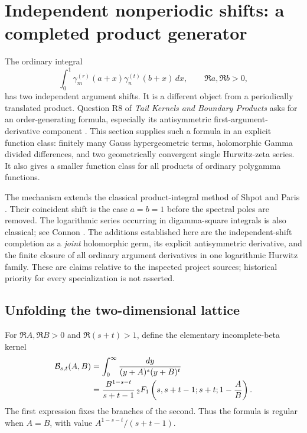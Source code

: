 \newcommand{\gsZ}{\mathcal Z}
\newcommand{\gsJ}{\mathcal J}
\newcommand{\gsB}{\mathcal B}
\newcommand{\gsV}{\mathcal V}
\newcommand{\gsQ}{\mathcal Q}
\newcommand{\gsE}{\mathcal E}
\newcommand{\gsT}{\mathcal T}
\newcommand{\gsL}{\mathcal L}

\section{Independent nonperiodic shifts: a completed product generator}
\label{gs:section}

The ordinary integral
\[
 \int_0^1\gamma_m^{(r)}(a+x)\gamma_n^{(t)}(b+x)\,dx,
 \qquad \Re a,\Re b>0,
\]
has two independent argument shifts.  It is a different object from a
periodically translated product.  Question R8 of \emph{Tail Kernels and
Boundary Products} asks for an order-generating formula, especially its
antisymmetric first-argument-derivative component
\cite{RepoTailKernels}.  This section supplies such a formula in an
explicit function class: finitely many Gauss hypergeometric terms,
holomorphic Gamma divided differences, and two geometrically convergent
single Hurwitz-zeta series.  It also gives a smaller function class for
all products of ordinary polygamma functions.

The mechanism extends the classical product-integral method of
Shpot and Paris \cite{ShpotParis}.  Their coincident shift is the
case $a=b=1$ before the spectral poles are removed.  The logarithmic
series occurring in digamma-square integrals is also classical; see
Connon \cite{Connon}.  The additions established here are the
independent-shift completion as a \emph{joint} holomorphic germ, its
explicit antisymmetric derivative, and the finite closure of all
ordinary argument derivatives in one logarithmic Hurwitz family.
These are claims relative to the inspected project sources; historical
priority for every specialization is not asserted.

\subsection{Unfolding the two-dimensional lattice}

For $\Re A,\Re B>0$ and $\Re(s+t)>1$, define the elementary
incomplete-beta kernel
\begin{align}
 \gsB_{s,t}(A,B)
 &=\int_0^\infty\frac{dy}{(y+A)^s(y+B)^t}\notag\\
 &=\frac{B^{1-s-t}}{s+t-1}\,
 {}_2F_1\left(s,s+t-1;s+t;1-\frac AB\right).
 \label{gs:beta-kernel}
\end{align}
The first expression fixes the branches of the second.  Thus the
formula is regular when $A=B$, with value
$A^{1-s-t}/(s+t-1)$.

